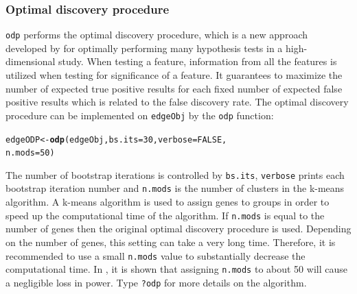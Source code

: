 \documentclass{article}\usepackage[]{graphicx}\usepackage[]{color}
\makeatletter
\newcommand{\hlnum}[1]{\textcolor[rgb]{0.686,0.059,0.569}{#1}}%
\newcommand{\hlstd}[1]{\textcolor[rgb]{0.345,0.345,0.345}{#1}}%
\newcommand{\hlkwb}[1]{\textcolor[rgb]{0.69,0.353,0.396}{#1}}%
\newcommand{\hlkwc}[1]{\textcolor[rgb]{0.333,0.667,0.333}{#1}}%
\newcommand{\hlkwd}[1]{\textcolor[rgb]{0.737,0.353,0.396}{\textbf{#1}}}%
\newenvironment{kframe}{%
 \def\at@end@of@kframe{}%
 \ifinner\ifhmode%
  \def\at@end@of@kframe{\end{minipage}}%
  \begin{minipage}{\columnwidth}%
 \fi\fi%
 \def\FrameCommand##1{\hskip\@totalleftmargin \hskip-\fboxsep
 \colorbox{shadecolor}{##1}\hskip-\fboxsep
     \hskip-\linewidth \hskip-\@totalleftmargin \hskip\columnwidth}%
 \MakeFramed {\advance\hsize-\width
   \@totalleftmargin\z@ \linewidth\hsize
   \@setminipage}}%
 {\par\unskip\endMakeFramed%
 \at@end@of@kframe}
\newenvironment{knitrout}{}{} %
\makeatother
\begin{document}
\subsubsection{Optimal discovery procedure}
{\tt odp} performs the optimal discovery procedure, which is a new approach developed by \cite{storey:2005} for optimally performing many hypothesis tests in a high-dimensional study. When testing a feature, information from all the features is utilized when testing for significance of a feature. It guarantees to maximize the number of expected true positive results for each fixed number of expected false positive results which is related to the false discovery rate. The optimal discovery procedure can be implemented on {\tt edgeObj} by the {\tt odp} function:
\begin{knitrout}
\color{fgcolor}\begin{kframe}
\begin{alltt}
\hlstd{edgeODP} \hlkwb{<-} \hlkwd{odp}\hlstd{(edgeObj,} \hlkwc{bs.its} \hlstd{=} \hlnum{30}\hlstd{,} \hlkwc{verbose} \hlstd{=} \hlnum{FALSE}\hlstd{,}
    \hlkwc{n.mods} \hlstd{=} \hlnum{50}\hlstd{)}
\end{alltt}
\end{kframe}
\end{knitrout}
The number of bootstrap iterations is controlled by {\tt bs.its}, {\tt verbose} prints each bootstrap iteration number and {\tt n.mods} is the number of clusters in the k-means algorithm. A k-means algorithm is used to assign genes to groups in order to speed up the computational time of the algorithm. If {\tt n.mods} is equal to the number of genes then the original optimal discovery procedure is used. Depending on the number of genes, this setting can take a very long time.  Therefore, it is recommended to use a small {\tt n.mods} value to substantially decrease the computational time. In \cite{woo:leek:storey:2011}, it is shown that assigning {\tt n.mods} to about 50 will cause a negligible loss in power. Type {\tt ?odp} for more details on the algorithm.
\end{document}
